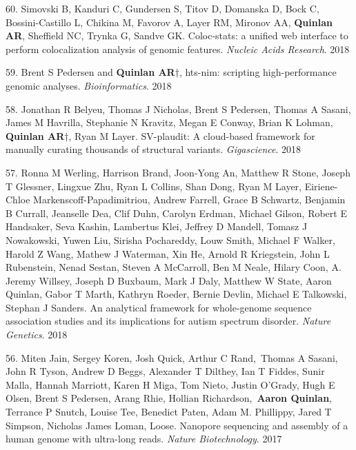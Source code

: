 \documentclass[margin,line]{cv}
\begin{document}
\begin{resume}
\begin{list}{*}{}
    \item[60.] Simovski B, Kanduri C, Gundersen S, Titov D, Domanska D, Bock C, Bossini-Castillo L, Chikina M, Favorov A, Layer RM, Mironov AA, \textbf{Quinlan AR}, Sheffield NC, Trynka G, Sandve GK. Coloc-stats: a unified web interface to perform colocalization analysis of genomic features. \emph{Nucleic Acids Research}. 2018 

    \item[59.] Brent S Pedersen and \textbf{Quinlan AR}$\dagger$, hts-nim: scripting high-performance genomic analyses. \emph{Bioinformatics}. 2018

    \item[58.] Jonathan R Belyeu, Thomas J Nicholas, Brent S Pedersen, Thomas A Sasani, James M Havrilla, Stephanie N Kravitz, Megan E Conway, Brian K Lohman, \textbf{Quinlan AR}$\dagger$, Ryan M Layer. SV-plaudit: A cloud-based framework for manually curating thousands of structural variants. \emph{Gigascience}. 2018

    \item[57.] Ronna M Werling, Harrison Brand, Joon-Yong An, Matthew R Stone, Joseph T Glessner, Lingxue Zhu, Ryan L Collins, Shan Dong, Ryan M Layer, Eiriene-Chloe Markenscoff-Papadimitriou, Andrew Farrell, Grace B Schwartz, Benjamin B Currall, Jeanselle Dea, Clif Duhn, Carolyn Erdman, Michael Gilson, Robert E Handsaker, Seva Kashin, Lambertus Klei, Jeffrey D Mandell, Tomasz J Nowakowski, Yuwen Liu, Sirisha Pochareddy, Louw Smith, Michael F Walker, Harold Z Wang, Mathew J Waterman, Xin He, Arnold R Kriegstein, John L Rubenstein, Nenad Sestan, Steven A McCarroll, Ben M Neale, Hilary Coon, A. Jeremy Willsey, Joseph D Buxbaum, Mark J Daly, Matthew W State, Aaron Quinlan, Gabor T Marth, Kathryn Roeder, Bernie Devlin, Michael E Talkowski, Stephan J Sanders.
    An analytical framework for whole-genome sequence association studies and its implications for autism spectrum disorder. \emph{Nature Genetics}. 2018

    \item[56.] Miten Jain, Sergey Koren, Josh Quick, Arthur C Rand, Thomas A Sasani, John R Tyson, Andrew D Beggs, Alexander T Dilthey, Ian T Fiddes, Sunir Malla, Hannah Marriott, Karen H Miga, Tom Nieto, Justin O'Grady, Hugh E Olsen, Brent S Pedersen, Arang Rhie, Hollian Richardson, \textbf{Aaron Quinlan}, Terrance P Snutch, Louise Tee, Benedict Paten, Adam M. Phillippy, Jared T Simpson, Nicholas James Loman, Loose. 
    Nanopore sequencing and assembly of a human genome with ultra-long reads. \emph{Nature Biotechnology}. 2017


\end{list}
\end{resume}
\end{document}

